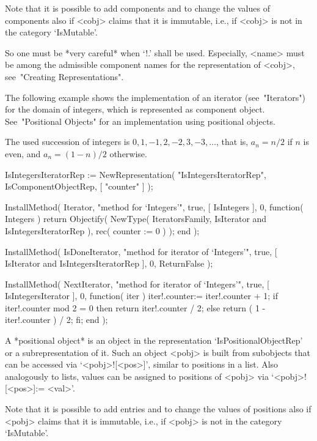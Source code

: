 Note that it is possible to add components and to change the values of
components also if <cobj> claims that it is immutable, i.e., if <cobj>
is not in the category `IsMutable'.

So one must be *very careful* when `!.' shall be used.
Especially, <name> must be among the admissible component names for
the representation of <cobj>, see~"Creating Representations".

The following example shows the implementation of an iterator
(see~"Iterators") for the domain of integers,
which is represented as component object.
See~"Positional Objects" for an implementation using positional objects.

The used succession of integers is $0, 1, -1, 2, -2, 3, -3, \ldots$,
that is, $a_n = n/2$ if $n$ is even,
and $a_n = (1-n)/2$ otherwise.

\begintt
    IsIntegersIteratorRep := NewRepresentation( "IsIntegersIteratorRep",
        IsComponentObjectRep, [ "counter" ] );

    InstallMethod( Iterator,
        "method for `Integers'",
        true,
        [ IsIntegers ], 0,
        function( Integers )
        return Objectify( NewType( IteratorsFamily,
                                       IsIterator
                                   and IsIntegersIteratorRep ),
                          rec( counter := 0 ) );
        end );

    InstallMethod( IsDoneIterator,
        "method for iterator of `Integers'",
        true,
        [ IsIterator and IsIntegersIteratorRep ], 0,
        ReturnFalse );

    InstallMethod( NextIterator,
        "method for iterator of `Integers'",
        true,
        [ IsIntegersIterator ], 0,
        function( iter )
        iter!.counter:= iter!.counter + 1;
        if iter!.counter mod 2 = 0 then
          return iter!.counter / 2;
        else
          return ( 1 - iter!.counter ) / 2;
        fi;
        end );
\endtt


A *positional object* is an object in the representation
`IsPositionalObjectRep' or a subrepresentation of it.
Such an object <pobj> is built from subobjects that can be accessed via
`<pobj>![<pos>]', similar to positions in a list.
Also analogously to lists, values can be assigned to positions of
<pobj> via `<pobj>![<pos>]:= <val>'.

Note that it is possible to add entries and to change the values of
positions also if <pobj> claims that it is immutable, i.e., if <pobj>
is not in the category `IsMutable'.

